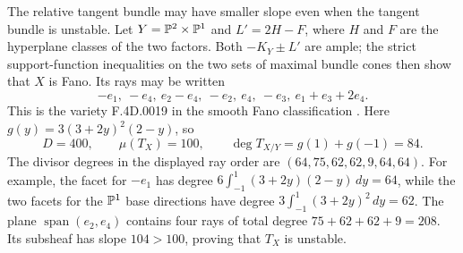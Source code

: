 \begin{example}\label{aux:p1counterexample}
The relative tangent bundle may have smaller slope even when the
tangent bundle is unstable. Let
$Y=\mathbb{P}^2\times\mathbb{P}^1$ and $L'=2H-F$, where $H$ and $F$ are the
hyperplane classes of the two factors. Both $-K_Y\pm L'$ are ample;
the strict support-function inequalities on the two sets of maximal
bundle cones then show that $X$ is Fano. Its rays may be written
\[
 -e_1,\ -e_4,\ e_2-e_4,\ -e_2,\ e_4,\ -e_3,\ e_1+e_3+2e_4.
\]
This is the variety F.4D.0019 in the smooth Fano classification
\cite{polyDB}.
Here $g(y)=3(3+2y)^2(2-y)$, so
\[
 D=400,\qquad\mu(T_X)=100,\qquad\deg T_{X/Y}=g(1)+g(-1)=84.
\]
The divisor degrees in the displayed ray order are
$(64,75,62,62,9,64,64)$. For example, the facet for $-e_1$ has degree
$6\int_{-1}^1(3+2y)(2-y)\,dy=64$, while the two facets for the
$\mathbb{P}^1$ base directions have degree
$3\int_{-1}^1(3+2y)^2\,dy=62$.
The plane $\operatorname{span}(e_2,e_4)$ contains four rays of total
degree $75+62+62+9=208$. Its subsheaf has slope $104>100$, proving
that $T_X$ is unstable.
\end{example}
